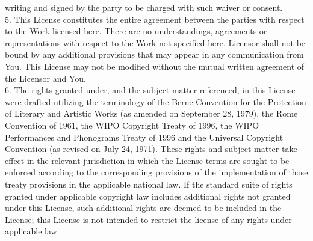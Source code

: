 {   writing and signed by the party to be charged with such waiver or
   consent.
\\[4pt]
   5. This License constitutes the entire agreement between the
   parties with respect to the Work licensed here. There are no
   understandings, agreements or representations with respect to the
   Work not specified here. Licensor shall not be bound by any
   additional provisions that may appear in any communication from
   You. This License may not be modified without the mutual written
   agreement of the Licensor and You.
\\[4pt]
   6. The rights granted under, and the subject matter referenced, in
   this License were drafted utilizing the terminology of the Berne
   Convention for the Protection of Literary and Artistic Works (as
   amended on September 28, 1979), the Rome Convention of 1961, the
   WIPO Copyright Treaty of 1996, the WIPO Performances and Phonograms
   Treaty of 1996 and the Universal Copyright Convention (as revised
   on July 24, 1971). These rights and subject matter take effect in
   the relevant jurisdiction in which the License terms are sought to
   be enforced according to the corresponding provisions of the
   implementation of those treaty provisions in the applicable
   national law. If the standard suite of rights granted under
   applicable copyright law includes additional rights not granted
   under this License, such additional rights are deemed to be
   included in the License; this License is not intended to restrict
   the license of any rights under applicable law.
}

